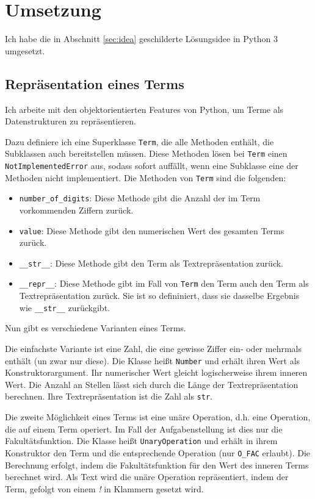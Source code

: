 \documentclass[a4paper,10pt,ngerman]{scrartcl}
\begin{document}
\section{Umsetzung}
Ich habe die in Abschnitt \ref{sec:idea} geschilderte Lösungsidee in Python 3 umgesetzt.

\subsection{Repräsentation eines Terms}
Ich arbeite mit den objektorientierten Features von Python, um Terme als Datenstrukturen zu repräsentieren.

Dazu definiere ich eine Superklasse \texttt{Term}, die alle Methoden enthält, die Subklassen auch bereitstellen müssen.
Diese Methoden lösen bei \texttt{Term} einen \texttt{NotImplementedError} aus, sodass sofort auffällt, wenn eine Subklasse eine der Methoden nicht implementiert.
Die Methoden von \texttt{Term} sind die folgenden:
\begin{itemize}
  \item \texttt{number\_of\_digits}: Diese Methode gibt die Anzahl der im Term vorkommenden Ziffern zurück.
  \item \texttt{value}: Diese Methode gibt den numerischen Wert des gesamten Terms zurück.
  \item \texttt{\_\_str\_\_}: Diese Methode gibt den Term als Textrepräsentation zurück.
  \item \texttt{\_\_repr\_\_}: Diese Methode gibt im Fall von \texttt{Term} den Term auch den Term als Textrepräsentation zurück.
  Sie ist so defininiert, dass sie dasselbe Ergebnis wie \texttt{\_\_str\_\_} zurückgibt.
\end{itemize}

Nun gibt es verschiedene Varianten eines Terms.

Die einfachste Variante ist eine Zahl, die eine gewisse Ziffer ein- oder mehrmals enthält (un zwar nur diese).
Die Klasse heißt \texttt{Number} und erhält ihren Wert als Konstruktorargument.
Ihr numerischer Wert gleicht logischerweise ihrem inneren Wert.
Die Anzahl an Stellen lässt sich durch die Länge der Textrepräsentation berechnen.
Ihre Textrepräsentation ist die Zahl als \texttt{str}.

Die zweite Möglichkeit eines Terms ist eine unäre Operation, d.h. eine Operation, die auf einem Term operiert.
Im Fall der Aufgabenstellung ist dies nur die Fakultätsfunktion.
Die Klasse heißt \texttt{UnaryOperation} und erhält in ihrem Konstruktor den Term und die entsprechende Operation (nur \texttt{O\_FAC} erlaubt).
Die Berechnung erfolgt, indem die Fakultätsfunktion für den Wert des inneren Terms berechnet wird.
Als Text wird die unäre Operation repräsentiert, indem der Term, gefolgt von einem \textit{!} in Klammern gesetzt wird.
\end{document}
